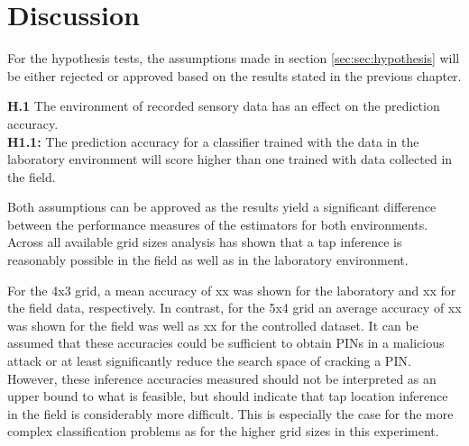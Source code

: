 \newpage
\section{Discussion}
For the hypothesis tests, the assumptions made in section \ref{sec:sec:hypothesis} will be either rejected or approved based on the results stated in the previous chapter.

\begin{center}
  \begin{framed}
    \textbf{H.1}  The environment of recorded sensory data has an effect on the prediction accuracy.\\
    \textbf{H1.1:} The prediction accuracy for a classifier trained with the data in the laboratory environment will score higher than one trained with data collected in the field.
  \end{framed}
\end{center}

Both assumptions can be approved as the results yield a significant difference between the performance measures of the estimators for both environments. Across all available grid sizes analysis has shown that a tap inference is reasonably possible in the field as well as in the laboratory environment. 

For the 4x3 grid, a mean accuracy of xx was shown for the laboratory and xx for the field data, respectively. In contrast, for the 5x4 grid an average accuracy of xx was shown for the field was well as xx for the controlled dataset. It can be assumed that these accuracies could be sufficient to obtain PINs in a malicious attack or at least significantly reduce the search space of cracking a PIN. However, these inference accuracies measured should not be interpreted as an upper bound to what is feasible, but should indicate that tap location inference in the field is considerably more difficult. This is especially the case for the more complex classification problems as for the higher grid sizes in this experiment.



